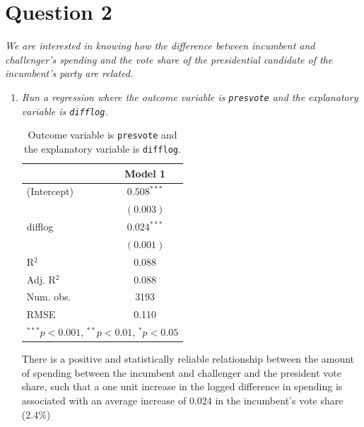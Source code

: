 \documentclass[12pt,letterpaper]{article}
\begin{document}
	\section*{Question 2}%
	\noindent \emph{We are interested in knowing how the difference between incumbent and challenger's spending and the vote share of the presidential candidate of the incumbent's party are related.}	\vspace{.25cm}
	\begin{enumerate}
		\item \emph{Run a regression where the outcome variable is \texttt{presvote} and the explanatory variable is \texttt{difflog}.}
		
		
		\begin{table}[h!]
			\begin{center}
				\caption{\footnotesize{Outcome variable is \texttt{presvote} and the explanatory variable is \texttt{difflog}.}} %
				\begin{tabular}{l c }
					\hline
					& Model 1 \\
					\hline
				(Intercept) & $0.508^{***}$ \\
            & $(0.003)$     \\
difflog     & $0.024^{***}$ \\
            & $(0.001)$     \\
\hline
R$^2$       & 0.088         \\
Adj. R$^2$  & 0.088         \\
Num. obs.   & 3193          \\
RMSE        & 0.110         \\
					\hline
					\multicolumn{2}{l}{\scriptsize{$^{***}p<0.001$, $^{**}p<0.01$, $^*p<0.05$}}
				\end{tabular}
				
			\end{center}
		\end{table}
		
		
		\noindent There is a positive and statistically reliable relationship between the amount of spending between the incumbent and challenger and the president vote share, such that a one unit increase in the logged difference in spending is associated with an average increase of 0.024 in the incumbent's vote share (2.4\%)	
		\newpage
		

\end{enumerate}
\end{document}
